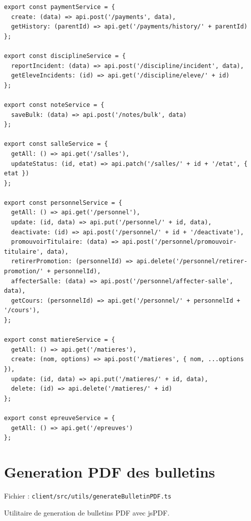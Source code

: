 \documentclass[12pt,a4paper]{article}
\begin{document}
\begin{lstlisting}[style=code]
export const paymentService = {
  create: (data) => api.post('/payments', data),
  getHistory: (parentId) => api.get('/payments/history/' + parentId)
};

export const disciplineService = {
  reportIncident: (data) => api.post('/discipline/incident', data),
  getEleveIncidents: (id) => api.get('/discipline/eleve/' + id)
};

export const noteService = {
  saveBulk: (data) => api.post('/notes/bulk', data)
};

export const salleService = {
  getAll: () => api.get('/salles'),
  updateStatus: (id, etat) => api.patch('/salles/' + id + '/etat', { etat })
};

export const personnelService = {
  getAll: () => api.get('/personnel'),
  update: (id, data) => api.put('/personnel/' + id, data),
  deactivate: (id) => api.post('/personnel/' + id + '/deactivate'),
  promouvoirTitulaire: (data) => api.post('/personnel/promouvoir-titulaire', data),
  retirerPromotion: (personnelId) => api.delete('/personnel/retirer-promotion/' + personnelId),
  affecterSalle: (data) => api.post('/personnel/affecter-salle', data),
  getCours: (personnelId) => api.get('/personnel/' + personnelId + '/cours'),
};

export const matiereService = {
  getAll: () => api.get('/matieres'),
  create: (nom, options) => api.post('/matieres', { nom, ...options }),
  update: (id, data) => api.put('/matieres/' + id, data),
  delete: (id) => api.delete('/matieres/' + id)
};

export const epreuveService = {
  getAll: () => api.get('/epreuves')
};
\end{lstlisting}

\newpage

\section{Generation PDF des bulletins}

Fichier : \texttt{client/src/utils/generateBulletinPDF.ts}

Utilitaire de generation de bulletins PDF avec jsPDF.
\end{document}
